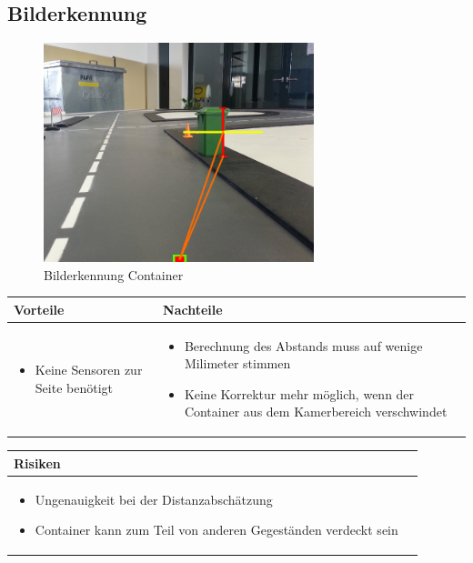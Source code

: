 \subsection{Bilderkennung}
\begin{figure}[h!]%
\centering
\includegraphics[width=0.7\textwidth]{fig/containererkennung_detailliert_bilderkennung.png}
\caption{Bilderkennung Container}
\label{fig:Bilderkennung Container}
\end{figure}
\begin{table}[h]
\begin{tabular}{p{} | p{}}


 \textbf{Vorteile} & \textbf{Nachteile} \\ \hline
	 
\begin{itemize}
\item Keine Sensoren zur Seite benötigt
\end{itemize}

 
 &
 
\begin{itemize}
\item Berechnung des Abstands muss auf wenige Milimeter stimmen
\item Keine Korrektur mehr möglich, wenn der Container aus dem Kamerbereich verschwindet
\end{itemize}

\end{tabular}
\end{table}

\begin{table}[h]
\begin{tabular}{p{}p{}}


 \textbf{Risiken} & \\ \hline
	 
\begin{itemize}
\item Ungenauigkeit bei der Distanzabschätzung
\item Container kann zum Teil von anderen Gegeständen verdeckt sein
\end{itemize}

 
\end{tabular}
\end{table}

\pagebreak
